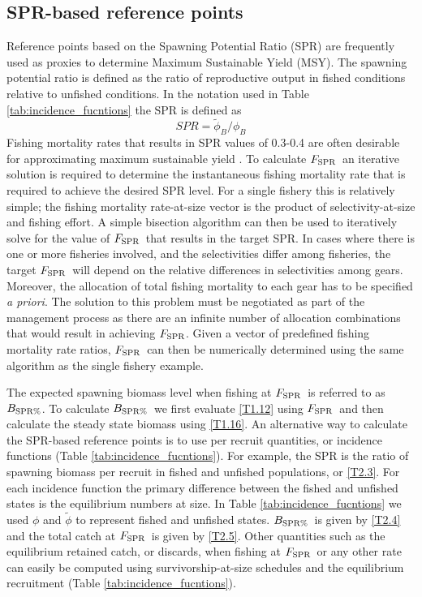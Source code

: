 \documentclass[12pt,letterpaper]{article}
\newcommand{\fspr}{$F_{\textnormal{SPR}}$}
\newcommand{\bspr}{$B_{\textnormal{SPR\%}}$}
\begin{document}
    \subsection*{SPR-based reference points} %
    \label{sub:spr_based_reference_points}
    Reference points based on the Spawning Potential Ratio (SPR) are frequently used as proxies to determine Maximum Sustainable Yield (MSY).  The spawning potential ratio is defined as the ratio of reproductive output in fished conditions relative to unfished conditions.  In the notation used in Table  \ref{tab:incidence_fucntions} the SPR is defined as
    \begin{equation}
      SPR = \tilde{\phi}_B/\phi_B
    \end{equation}
    Fishing mortality rates that results in SPR values of 0.3-0.4 are often desirable for approximating maximum sustainable yield \citep{clark2002f}.  To calculate \fspr\ an iterative solution is required to determine the instantaneous fishing mortality rate that is required to achieve the desired SPR level.  For a single fishery this is relatively simple; the fishing mortality rate-at-size vector is the product of selectivity-at-size and fishing effort.  A simple bisection algorithm can then be used to iteratively solve for the value of \fspr\ that results in the target SPR.  In cases where there is one or more fisheries involved, and the selectivities differ among fisheries, the target \fspr\ will depend on the relative differences in selectivities among gears.  Moreover, the allocation of total fishing mortality to each gear has to be specified \textit{a priori}.  The solution to this problem must be negotiated as part of the management process as there are an infinite number of allocation combinations that would result in achieving \fspr.  Given a vector of predefined fishing mortality rate ratios, \fspr\ can then be numerically determined using the same algorithm as the single fishery example.

    The expected spawning biomass level when fishing at \fspr\ is referred to as \bspr.  To calculate \bspr\ we first evaluate \eqref{T1.12} using \fspr\ and then calculate the steady state biomass using \eqref{T1.16}. An alternative way to calculate the SPR-based reference points is to use per recruit quantities, or incidence functions (Table \ref{tab:incidence_fucntions}). For example, the SPR is the ratio of spawning biomass per recruit in fished and unfished populations, or \eqref{T2.3}. For each incidence function the primary difference between the fished and unfished states is the equilibrium numbers at size.  In Table \ref{tab:incidence_fucntions} we used $\phi$ and $\tilde{\phi}$ to represent fished and unfished states.    \bspr\ is given by \eqref{T2.4} and the total catch at \fspr\ is given by \eqref{T2.5}.  Other quantities such as the equilibrium  retained catch, or discards,  when fishing at \fspr\ or any other rate can easily be computed using survivorship-at-size schedules and the equilibrium recruitment (Table \ref{tab:incidence_fucntions}).
\end{document}
